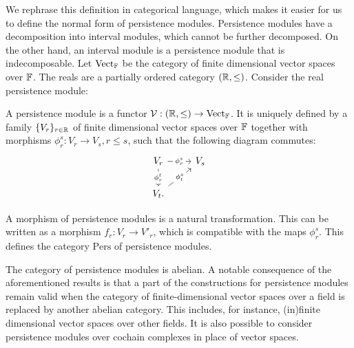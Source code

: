 We rephrase this definition in categorical language, which makes it easier for us to define the normal form of persistence modules. Persistence modules have a decomposition into interval modules, which cannot be further decomposed. On the other hand, an interval module is a persistence module that is indecomposable. Let $\operatorname{Vect}_{\mathbb{F}}$ be the category of finite dimensional vector spaces over ${\mathbb{F}}$. The reals are a partially ordered category $({\mathbb{R}}, \leq)$. Consider the real persistence module:

\begin{definition}{\cite[\S 1.3]{chazal2016structure}}
A persistence module is a functor $\mathcal{V}: ({\mathbb{R}},\leq) \rightarrow \operatorname{Vect}_{\mathbb{F}}$. It is uniquely defined by a family $\{V_r\}_{r\in{\mathbb{R}}}$ of finite dimensional vector spaces over ${\mathbb{F}}$ together with morphisms $\phi_{r}^{s}: V_r \rightarrow V_s, r \leq s$, such that the following diagram commutes:
\begin{equation}
\begin{tikzcd}
V_r \arrow[d, "{\phi_{r}^{t}}" description] \arrow[r, "{\phi_{r}^{s}}" description] & V_s \\
V_t. \arrow[ru, "{\phi_{t}^{s}}" description]                                      &    
\end{tikzcd}
\end{equation}
\end{definition}

\begin{remark}
A morphism of persistence modules is a natural transformation. This can be written as a morphism $f_r: V_r \rightarrow V'_r$, which is compatible with the maps $\phi_{r}^{s}$. This defines the category $\mathrm{Pers}$ of persistence modules.
\end{remark}

The category of persistence modules is abelian. A notable consequence of the aforementioned results is that a part of the constructions for persistence modules remain valid when the category of finite-dimensional vector spaces over a field is replaced by another abelian category. This includes, for instance, (in)finite dimensional vector spaces over other fields. It is also possible to consider persistence modules over cochain complexes in place of vector spaces.

